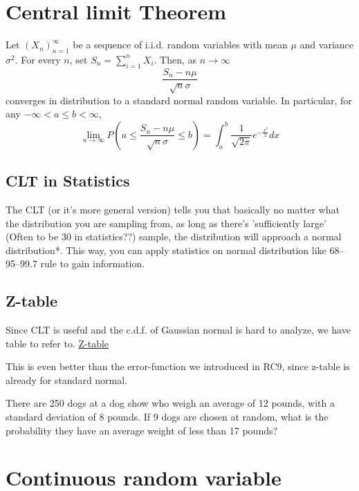 \section{Central limit Theorem}
\begin{theorem}[CLT]
    Let \((X_n)_{n=1}^{\infty} \) be a sequence of i.i.d. random variables with mean \(\mu \) and variance \(\sigma^2 \). 
    For every \(n\), set \(S_n = \sum_{i=1}^{n} X_i\). Then, as \(n \to \infty\)
    \[
        \frac{S_n - n \mu }{\sqrt{n} \sigma }
    \] 
    converges in distribution to a standard normal random variable. In particular, for any \(-\infty <a \leq b < \infty \), 
    \[
        \lim\limits_{n \to \infty} P(a \leq \frac{S_n -n \mu }{\sqrt{n}\sigma  } \leq  b) = \int_a^b \frac{1}{\sqrt{2\pi } } e^{-\frac{x^2}{2}}dx
    \]
\end{theorem}
\subsection*{CLT in Statistics}
The CLT (or it's more general version) tells you that basically no matter what the distribution you are sampling from, as long as there's 'sufficiently large' (Often to be 30 in statistics??) sample, the distribution will approach a normal distribution*. This way, you can apply statistics on normal distribution like 68–95–99.7 rule to gain information. 

\subsection*{Z-table}
Since CLT is useful and the c.d.f. of Gaussian normal is hard to analyze, we have table to refer to. 
\href{https://www.z-table.com/}{Z-table}

This is even better than the error-function we introduced in RC9, since z-table is already for standard normal. 
\begin{exercise}
    There are 250 dogs at a dog show who weigh an average of 12 pounds, with a standard deviation of 8 pounds. If 9 dogs are chosen at random, what is the probability they have an average weight of less than 17 pounds?
\end{exercise}
\section{Continuous random variable}
